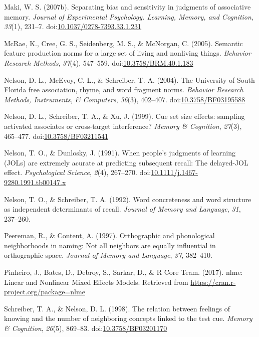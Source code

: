 \documentclass[english,man]{apa6}
\theoremstyle{definition}
\theoremstyle{definition}
\theoremstyle{definition}
\theoremstyle{remark}
\begin{document}
\hypertarget{ref-Maki2007}{}
Maki, W. S. (2007b). Separating bias and sensitivity in judgments of
associative memory. \emph{Journal of Experimental Psychology. Learning,
Memory, and Cognition}, \emph{33}(1), 231--7.
doi:\href{https://doi.org/10.1037/0278-7393.33.1.231}{10.1037/0278-7393.33.1.231}

\hypertarget{ref-McRae2005}{}
McRae, K., Cree, G. S., Seidenberg, M. S., \& McNorgan, C. (2005).
Semantic feature production norms for a large set of living and
nonliving things. \emph{Behavior Research Methods}, \emph{37}(4),
547--559.
doi:\href{https://doi.org/10.3758/BRM.40.1.183}{10.3758/BRM.40.1.183}

\hypertarget{ref-Nelson2004}{}
Nelson, D. L., McEvoy, C. L., \& Schreiber, T. A. (2004). The University
of South Florida free association, rhyme, and word fragment norms.
\emph{Behavior Research Methods, Instruments, \& Computers},
\emph{36}(3), 402--407.
doi:\href{https://doi.org/10.3758/BF03195588}{10.3758/BF03195588}

\hypertarget{ref-Nelson1999}{}
Nelson, D. L., Schreiber, T. A., \& Xu, J. (1999). Cue set size effects:
sampling activated associates or cross-target interference? \emph{Memory
\& Cognition}, \emph{27}(3), 465--477.
doi:\href{https://doi.org/10.3758/BF03211541}{10.3758/BF03211541}

\hypertarget{ref-Nelson1991}{}
Nelson, T. O., \& Dunlosky, J. (1991). When people's judgments of
learning (JOLs) are extremely acurate at predicting subsequent recall:
The delayed-JOL effect. \emph{Psychological Science}, \emph{2}(4),
267--270.
doi:\href{https://doi.org/10.1111/j.1467-9280.1991.tb00147.x}{10.1111/j.1467-9280.1991.tb00147.x}

\hypertarget{ref-Nelson1992}{}
Nelson, T. O., \& Schreiber, T. A. (1992). Word concreteness and word
structure as independent determinants of recall. \emph{Journal of Memory
and Language}, \emph{31}, 237--260.

\hypertarget{ref-Peereman1997}{}
Peereman, R., \& Content, A. (1997). Orthographic and phonological
neighborhoods in naming: Not all neighbors are equally influential in
orthographic space. \emph{Journal of Memory and Language}, \emph{37},
382--410.

\hypertarget{ref-Pinheiro2017}{}
Pinheiro, J., Bates, D., Debroy, S., Sarkar, D., \& R Core Team. (2017).
nlme: Linear and Nonlinear Mixed Effects Models. Retrieved from
\url{https://cran.r-project.org/package=nlme}

\hypertarget{ref-Schreiber1998}{}
Schreiber, T. A., \& Nelson, D. L. (1998). The relation between feelings
of knowing and the number of neighboring concepts linked to the test
cue. \emph{Memory \& Cognition}, \emph{26}(5), 869--83.
doi:\href{https://doi.org/10.3758/BF03201170}{10.3758/BF03201170}
\end{document}
